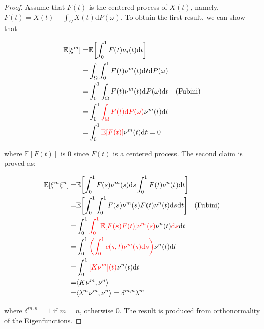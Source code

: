 \documentclass[11pt,twoside,a4paper]{article}
\begin{document}
	\begin{proof}
		Assume that $F(t)$ is the centered process of $X(t)$, namely, $F(t) = X(t) - \int_{\Omega}X(t)\mathrm{d}P(\omega)$. To obtain the first result, we can show that
		
		\begin{equation}\label{Lemma1}
			\begin{split}
				\mathbb{E}[\xi^m] = & \mathbb{E} \biggl\lbrack \int_{0}^{1} F(t) \nu_{j}(t)\mathrm{d}t\biggr\rbrack\\
				= & \int_{\Omega} \int_{0}^{1} F(t) \nu^m(t) \mathrm{d}t \mathrm{d}P(\omega)\\
				= & \int_{0}^{1} \int_{\Omega} F(t) \nu^m(t) \mathrm{d}P(\omega) \mathrm{d}t \quad
				\text{(Fubini)}\\
				= & \int_{0}^{1} {\color{red}\int_{\Omega} F(t) \mathrm{d}P(\omega)} \nu^m(t) \mathrm{d}t\\
				= & \int_{0}^{1} {\color{red}\mathbb{E}[F(t)]} \nu^m(t) \mathrm{d}t = 0
			\end{split}
		\end{equation}
	
		where $\mathbb{E}[F(t)]$ is 0 since $F(t)$ is a centered process.
		The second claim is proved as:
		
		\begin{equation}\label{Lemma2}
			\begin{split}
				\mathbb{E} [\xi^m \xi^n] = & \mathbb{E}  \biggl\lbrack \int_{0}^{1} F(s) \nu^m(s)\mathrm{d}s \int_{0}^{1} F(t) \nu^n(t)\mathrm{d}t  \biggr\rbrack\\
				= & \mathbb{E} \biggl\lbrack {\int_{0}^{1} \int_{0}^{1} F(s) \nu^m(s) F(t) \nu^n(t) \mathrm{d}s \mathrm{d}t} \biggr\rbrack \quad \text{(Fubini)}\\
				= & \int_{0}^{1} {\color{red}\int_{0}^{1} \mathbb{E}[{F(s)F(t)}] \nu^m(s)} \nu^n(t) {\color{red}\mathrm{d}s} \mathrm{d}t\\
				= & \int_{0}^{1} {\color{red}\left(\int_{0}^{1}c(s,t)\nu^m(s)\mathrm{d}s \right)} \nu^n(t) \mathrm{d}t \\
				= & \int_{0}^{1}{\color{red}[K\nu^m](t)}\nu^n(t)\mathrm{d}t\\
				= & \langle K \nu^m, \nu^n \rangle\\
				= & \langle \lambda^m \nu^m, \nu^n \rangle = \delta^{m,n}\lambda^{m}
			\end{split}
		\end{equation}
	
		where $\delta^{m,n} = 1$ if $m = n$, otherwise 0. The result is produced from orthonormality of the Eigenfunctions.
		

\end{proof}
\end{document}
